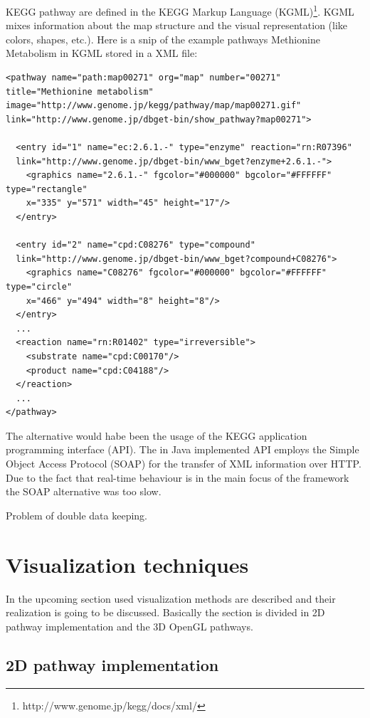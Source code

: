 KEGG pathway are defined in the KEGG Markup Language (KGML)\footnote{http://www.genome.jp/kegg/docs/xml/}.
KGML mixes information about the map structure and the visual representation (like colors, shapes, etc.).
Here is a snip of the example pathways Methionine Metabolism in KGML stored in a XML file:

\begin{verbatim}
<pathway name="path:map00271" org="map" number="00271" 
title="Methionine metabolism" 
image="http://www.genome.jp/kegg/pathway/map/map00271.gif" 
link="http://www.genome.jp/dbget-bin/show_pathway?map00271">

  <entry id="1" name="ec:2.6.1.-" type="enzyme" reaction="rn:R07396"
  link="http://www.genome.jp/dbget-bin/www_bget?enzyme+2.6.1.-">
    <graphics name="2.6.1.-" fgcolor="#000000" bgcolor="#FFFFFF" type="rectangle" 
    x="335" y="571" width="45" height="17"/>
  </entry>

  <entry id="2" name="cpd:C08276" type="compound" 
  link="http://www.genome.jp/dbget-bin/www_bget?compound+C08276">
    <graphics name="C08276" fgcolor="#000000" bgcolor="#FFFFFF" type="circle" 
    x="466" y="494" width="8" height="8"/>
  </entry>
  ...
  <reaction name="rn:R01402" type="irreversible">
    <substrate name="cpd:C00170"/>
    <product name="cpd:C04188"/>
  </reaction>
  ...
</pathway>
\end{verbatim}

The alternative would habe been the usage of the KEGG application programming interface (API). The in Java implemented API employs the Simple Object Access Protocol (SOAP) for the transfer of XML information over HTTP. Due to the fact that real-time behaviour is in the main focus of the framework the SOAP alternative was too slow.

Problem of double data keeping. 

\section{Visualization techniques}

In the upcoming section used visualization methods are described and their realization is going to be discussed. Basically the section is divided in 2D pathway implementation and the 3D OpenGL pathways.

\subsection{2D pathway implementation}

